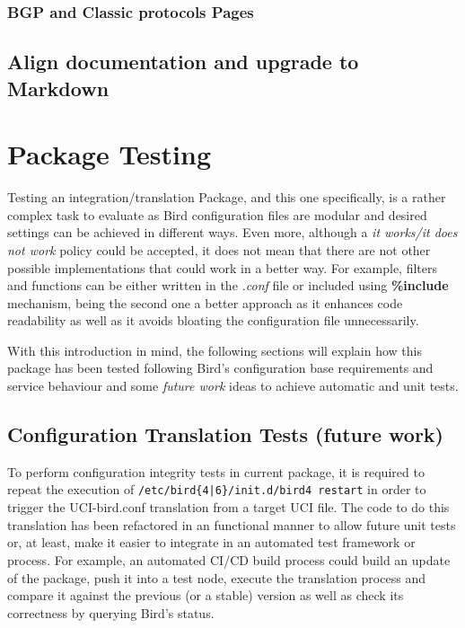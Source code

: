 \subsubsection{BGP and Classic protocols Pages}

\subsection{Align documentation and upgrade to Markdown}

\newpage
\section{Package Testing}
Testing an integration/translation Package, and this one specifically, is a rather complex task to evaluate as Bird configuration files are modular and desired settings can be achieved in different ways. Even more, although a \textit{it works/it does not work} policy could be accepted, it does not mean that there are not other possible implementations that could work in a better way. For example, filters and functions can be either written in the \textit{.conf} file or included using \textbf{\%include} mechanism, being the second one a better approach as it enhances code readability as well as it avoids bloating the configuration file unnecessarily.

With this introduction in mind, the following sections will explain how this package has been tested following Bird's configuration base requirements and service behaviour and some \textit{future work} ideas to achieve automatic and unit tests.


\subsection{Configuration Translation Tests (future work)}
To perform configuration integrity tests in current package, it is required to repeat the execution of \texttt{/etc/bird\{4|6\}/init.d/bird4 restart} in order to trigger the UCI-bird.conf translation from a target UCI file. The code to do this translation has been refactored in an functional manner to allow future unit tests or, at least, make it easier to integrate in an automated test framework or process. For example, an automated CI/CD build process could build an update of the package, push it into a test node, execute the translation process and compare it against the previous (or a stable) version as well as check its correctness by querying Bird's status.

